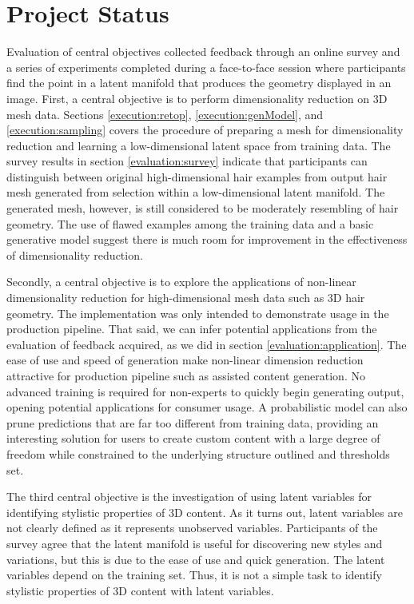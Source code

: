 \documentclass[ %
author={Dillon Keith Diep},
supervisor={Dr. Carl Henrik Ek},
degree={MEng},
title={ART-CG Hair:},
subtitle={Assisted Real-time Content Generation of Stylised Virtual Hair},
type={Research},
year={2017} ]{dissertation}
\begin{document}
\section{Project Status}
Evaluation of central objectives collected feedback through an online survey and a series of experiments completed during a face-to-face session where participants find the point in a latent manifold that produces the geometry displayed in an image.
First, a central objective is to perform dimensionality reduction on 3D mesh data.
Sections \ref{execution:retop}, \ref{execution:genModel}, and \ref{execution:sampling} covers the procedure of preparing a mesh for dimensionality reduction and learning a low-dimensional latent space from training data.
The survey results in section \ref{evaluation:survey} indicate that participants can distinguish between original high-dimensional hair examples from output hair mesh generated from selection within a low-dimensional latent manifold. The generated mesh, however, is still considered to be moderately resembling of hair geometry. The use of flawed examples among the training data and a basic generative model suggest there is much room for improvement in the effectiveness of dimensionality reduction.


Secondly, a central objective is to explore the applications of non-linear dimensionality reduction for high-dimensional mesh data such as 3D hair geometry.
The implementation was only intended to demonstrate usage in the production pipeline. That said, we can infer potential applications from the evaluation of feedback acquired, as we did in section \ref{evaluation:application}.
The ease of use and speed of generation make non-linear dimension reduction attractive for production pipeline such as assisted content generation.
No advanced training is required for non-experts to quickly begin generating output, opening potential applications for consumer usage.
A probabilistic model can also prune predictions that are far too different from training data, providing an interesting solution for users to create custom content with a large degree of freedom while constrained to the underlying structure outlined and thresholds set.

The third central objective is the investigation of using latent variables for identifying stylistic properties of 3D content. As it turns out, latent variables are not clearly defined as it represents unobserved variables. Participants of the survey agree that the latent manifold is useful for discovering new styles and variations, but this is due to the ease of use and quick generation. The latent variables depend on the training set. Thus, it is not a simple task to identify stylistic properties of 3D content with latent variables.
\end{document}
